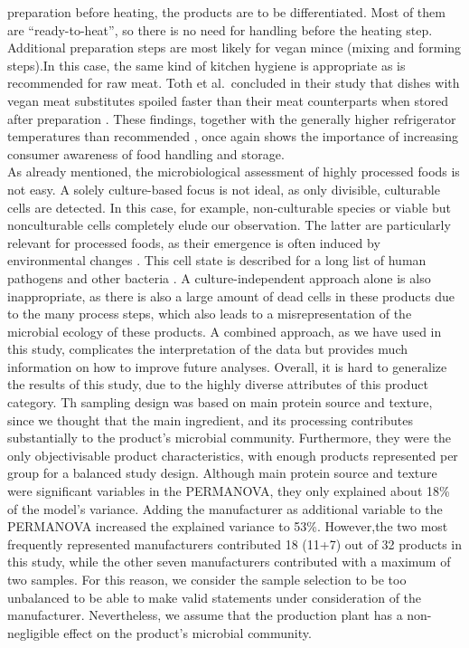 \documentclass[preprint, 3p,
authoryear]{elsarticle} %
\begin{document}
preparation before heating, the products are to be differentiated. Most
of them are ``ready-to-heat'', so there is no need for handling before
the heating step. Additional preparation steps are most likely for vegan
mince (mixing and forming steps).In this case, the same kind of kitchen
hygiene is appropriate as is recommended for raw meat. Toth et
al.~concluded in their study that dishes with vegan meat substitutes
spoiled faster than their meat counterparts when stored after
preparation \citep{Toth.2021}. These findings, together with the
generally higher refrigerator temperatures than recommended
\citep{James.2017}, once again shows the importance of increasing
consumer awareness of food handling and storage.\\
As already mentioned, the microbiological assessment of highly processed
foods is not easy. A solely culture-based focus is not ideal, as only
divisible, culturable cells are detected. In this case, for example,
non-culturable species or viable but nonculturable cells completely
elude our observation. The latter are particularly relevant for
processed foods, as their emergence is often induced by environmental
changes \citep{Zhao.2017}. This cell state is described for a long list
of human pathogens and other bacteria \citep{Li.2014, Dong.2020}. A
culture-independent approach alone is also inappropriate, as there is
also a large amount of dead cells in these products due to the many
process steps, which also leads to a misrepresentation of the microbial
ecology of these products. A combined approach, as we have used in this
study, complicates the interpretation of the data but provides much
information on how to improve future analyses. Overall, it is hard to
generalize the results of this study, due to the highly diverse
attributes of this product category. Th sampling design was based on
main protein source and texture, since we thought that the main
ingredient, and its processing contributes substantially to the
product's microbial community. Furthermore, they were the only
objectivisable product characteristics, with enough products represented
per group for a balanced study design. Although main protein source and
texture were significant variables in the PERMANOVA, they only explained
about 18\% of the model's variance. Adding the manufacturer as
additional variable to the PERMANOVA increased the explained variance to
53\%. However,the two most frequently represented manufacturers
contributed 18 (11+7) out of 32 products in this study, while the other
seven manufacturers contributed with a maximum of two samples. For this
reason, we consider the sample selection to be too unbalanced to be able
to make valid statements under consideration of the manufacturer.
Nevertheless, we assume that the production plant has a non-negligible
effect on the product's microbial community.
\end{document}
